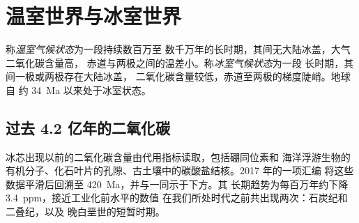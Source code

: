 \section{温室世界与冰室世界}\label{sec:b2:deep-time-climate:states}

\begin{definition}[温室气候状态与冰室气候状态]\label{def:b2:deep-time-climate:states}
称\emph{温室气候状态}为一段持续数百万至
数千万年的长时期，其间无大陆冰盖，大气二氧化碳含量高，
赤道与两极之间的温差小。称\emph{冰室气候状态}为一段
长时期，其间一极或两极存在大陆冰盖，
二氧化碳含量较低，赤道至两极的梯度陡峭。地球自
约 \qty{34}{Ma} 以来处于冰室状态。
\end{definition}

\subsection*{过去 4.2 亿年的二氧化碳}

冰芯出现以前的二氧化碳含量由代用指标读取，包括硼同位素和
海洋浮游生物的有机分子、化石叶片的孔隙、古土壤中的碳酸盐结核。2017 年的一项汇编
将这些数据平滑后回溯至 \qty{420}{Ma}，并与一同示于下方。其
长期趋势为每百万年约下降 \qty{3.4}{ppm}，接近工业化前水平的数值
在我们所处时代之前共出现两次：石炭纪和二叠纪，以及
晚白垩世的短暂时期。

